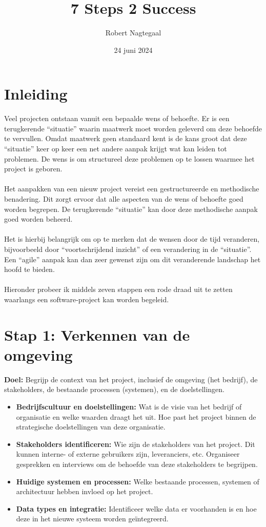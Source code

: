 \documentclass[8pt]{extarticle}
\title{7 Steps 2 Success}
\author{Robert Nagtegaal}
\date{24 juni 2024}
\begin{document}
\maketitle


\section*{Inleiding}
\noindent Veel projecten ontstaan vanuit een bepaalde wens of behoefte. Er is een terugkerende “situatie” waarin maatwerk moet worden geleverd om deze behoefde te vervullen. Omdat maatwerk geen standaard kent is de kans groot dat deze “situatie” keer op keer een net andere aanpak krijgt wat kan leiden tot problemen. De wens is om structureel deze problemen op te lossen waarmee het project is geboren.\\
\\
Het aanpakken van een nieuw project vereist een gestructureerde en methodische benadering. Dit zorgt ervoor dat alle aspecten van de wens of behoefte goed worden begrepen. De terugkerende “situatie” kan door deze methodische aanpak goed worden beheerd.\\
\\
Het is hierbij belangrijk om op te merken dat de wensen door de tijd veranderen, bijvoorbeeld door “voortschrijdend inzicht” of een verandering in de “situatie”. Een “agile” aanpak kan dan zeer gewenst zijn om dit veranderende landschap het hoofd te bieden.\\
\\
Hieronder probeer ik middels zeven stappen een rode draad uit te zetten waarlangs een software-project kan worden begeleid.

\newpage

%
%

\section*{Stap 1: Verkennen van de omgeving}
\textbf{Doel:} Begrijp de context van het project, inclusief de omgeving (het bedrijf), de stakeholders, de bestaande processen (systemen), en de doelstellingen.

\begin{itemize}
    \item \textbf{Bedrijfscultuur en doelstellingen:} Wat is de visie van het bedrijf of organisatie en welke waarden draagt het uit. Hoe past het project binnen de strategische doelstellingen van deze organisatie.
    \item \textbf{Stakeholders identificeren:} Wie zijn de stakeholders van het project. Dit kunnen interne- of externe gebruikers zijn, leveranciers, etc.  Organiseer gesprekken en interviews om de behoefde van deze stakeholders te begrijpen.
    \item \textbf{Huidige systemen en processen:} Welke bestaande processen, systemen of architectuur hebben invloed op het project. 
    \item \textbf{Data types en integratie:} Identificeer welke data er voorhanden is en hoe deze in het nieuwe systeem worden geïntegreerd.
\end{itemize}
\end{document}
